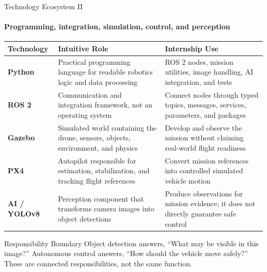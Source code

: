 \begin{frame}{Technology Ecosystem II}
\framesubtitle{Programming, integration, simulation, control, and perception}
\scriptsize
\renewcommand{\arraystretch}{1.18}
\begin{tabularx}{\textwidth}{>{\bfseries\color{um6p-color-dark-blue}}p{} X X}
\toprule
Technology & Intuitive Role & Internship Use \\
\midrule
Python & Practical programming language for readable robotics logic and data processing & ROS 2 nodes, mission utilities, image handling, AI integration, and tests \\
ROS 2 & Communication and integration framework, not an operating system & Connect nodes through typed topics, messages, services, parameters, and packages \\
Gazebo & Simulated world containing the drone, sensors, objects, environment, and physics & Develop and observe the mission without claiming real-world flight readiness \\
PX4 & Autopilot responsible for estimation, stabilization, and tracking flight references & Convert mission references into controlled simulated vehicle motion \\
AI / YOLOv8 & Perception component that transforms camera images into object detections & Produce observations for mission evidence; it does not directly guarantee safe control \\
\bottomrule
\end{tabularx}
\begin{alertblock}{Responsibility Boundary}
Object detection answers, ``What may be visible in this image?'' Autonomous control answers, ``How should the vehicle move safely?'' These are connected responsibilities, not the same function.
\end{alertblock}
\end{frame}

